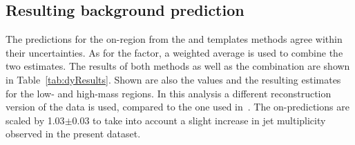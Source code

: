 \subsection{Resulting background prediction}
The predictions for the on-\Z region from the \JZB and \MET templates methods agree within their uncertainties. As for the \Rsfof factor, a weighted average is used to combine the two estimates. The results of both methods as well as the combination are shown in Table~\ref{tab:dyResults}. Shown are also the \Routin values and the resulting estimates for the low- and high-mass regions. In this analysis a different reconstruction version of the data is used, compared to the one used in~\cite{Khachatryan:2015lwa}. The on-\Z predictions are scaled by 1.03$\pm$0.03 to take into account a slight increase in jet multiplicity observed in the present dataset.




